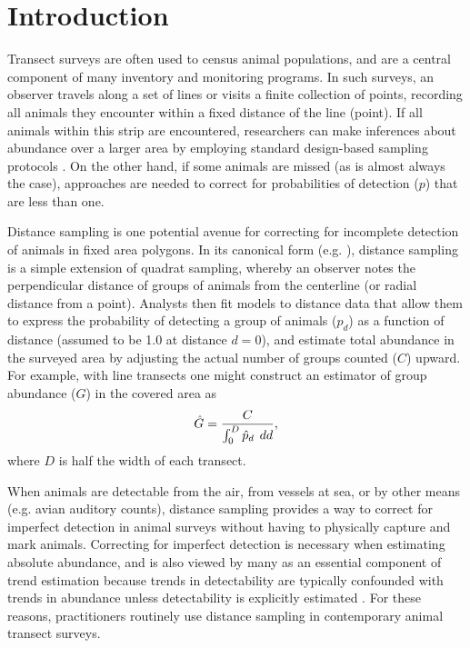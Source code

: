 \documentclass[10pt]{article}
\begin{document}

\section*{Introduction}

Transect surveys are often used to census animal populations, and are a central component of many inventory and monitoring programs.  In such surveys, an observer travels along a set of lines or visits a finite collection of points, recording all animals they encounter within a fixed distance of the line (point).  If all animals within this strip are encountered, researchers can make inferences about abundance over a larger area by employing standard design-based sampling protocols \cite{Cochran1977}.  On the other hand, if some animals are missed (as is almost always the case), approaches are needed to correct for probabilities of detection ($p$) that are less than one.

Distance sampling is one potential avenue for correcting for incomplete detection of animals in fixed area polygons.  In its canonical form (e.g. \cite{BurnhamEtAl1980,BucklandEtAl2001}), distance sampling is a simple extension of quadrat sampling, whereby an observer notes the perpendicular distance of groups of animals from the centerline (or radial distance from a point).  Analysts then fit models to distance data that allow them to express the probability of detecting a group of animals ($p_d$) as a function of distance (assumed to be 1.0 at distance $d=0$), and estimate total abundance in the surveyed area by adjusting the actual number of groups counted ($C$) upward.  For example, with line transects one might construct an estimator of group abundance ($G$) in the covered area as
$$
\hat{G} = \frac{C}{\int_0^D \hat{p}_d \hspace{1.5mm}dd},
$$
where $D$ is half the width of each transect.

When animals are detectable from the air, from vessels at sea, or by other means (e.g. avian auditory counts), distance sampling provides a way to correct for imperfect detection in animal surveys without having to physically capture and mark animals.  Correcting for imperfect detection is necessary when estimating absolute abundance, and is also viewed by many as an essential component of trend estimation because trends in detectability are typically confounded with trends in abundance unless detectability is explicitly estimated \cite{Buckland2006,NicholsEtAl2009}.  For these reasons, practitioners routinely use distance sampling in contemporary animal transect surveys.
\end{document}
